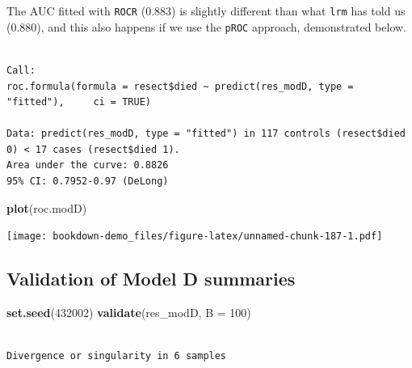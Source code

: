 \documentclass[]{book}
\newenvironment{Shaded}{\begin{snugshade}}{\end{snugshade}}
\newcommand{\KeywordTok}[1]{\textcolor[rgb]{0.13,0.29,0.53}{\textbf{#1}}}
\newcommand{\DataTypeTok}[1]{\textcolor[rgb]{0.13,0.29,0.53}{#1}}
\newcommand{\DecValTok}[1]{\textcolor[rgb]{0.00,0.00,0.81}{#1}}
\newcommand{\StringTok}[1]{\textcolor[rgb]{0.31,0.60,0.02}{#1}}
\newcommand{\OtherTok}[1]{\textcolor[rgb]{0.56,0.35,0.01}{#1}}
\newcommand{\OperatorTok}[1]{\textcolor[rgb]{0.81,0.36,0.00}{\textbf{#1}}}
\newcommand{\NormalTok}[1]{#1}
\theoremstyle{definition}
\theoremstyle{definition}
\theoremstyle{definition}
\theoremstyle{remark}
\begin{document}
The AUC fitted with \texttt{ROCR} (0.883) is slightly different than
what \texttt{lrm} has told us (0.880), and this also happens if we use
the \texttt{pROC} approach, demonstrated below.

\begin{Shaded}
\end{Shaded}

\begin{verbatim}

Call:
roc.formula(formula = resect$died ~ predict(res_modD, type = "fitted"),     ci = TRUE)

Data: predict(res_modD, type = "fitted") in 117 controls (resect$died 0) < 17 cases (resect$died 1).
Area under the curve: 0.8826
95% CI: 0.7952-0.97 (DeLong)
\end{verbatim}

\begin{Shaded}
\begin{Highlighting}[]
\KeywordTok{plot}\NormalTok{(roc.modD)}
\end{Highlighting}
\end{Shaded}

\texttt{[image: bookdown-demo\_files/figure-latex/unnamed-chunk-187-1.pdf]}

\subsection{Validation of Model D
summaries}\label{validation-of-model-d-summaries}

\begin{Shaded}
\begin{Highlighting}[]
\KeywordTok{set.seed}\NormalTok{(}\DecValTok{432002}\NormalTok{)}
\KeywordTok{validate}\NormalTok{(res_modD, }\DataTypeTok{B =} \DecValTok{100}\NormalTok{)}
\end{Highlighting}
\end{Shaded}

\begin{verbatim}

Divergence or singularity in 6 samples
\end{verbatim}
\end{document}
